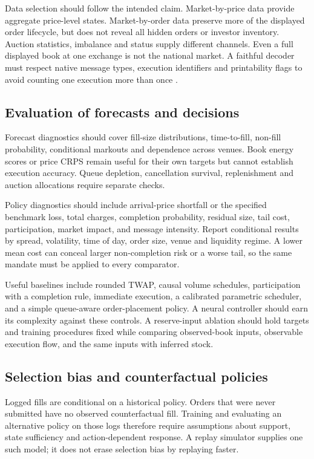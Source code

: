 \documentclass[11pt]{article}
\numberwithin{equation}{section}
\theoremstyle{definition}
\theoremstyle{remark}
\theoremstyle{definition}
\begin{document}
Data selection should follow the intended claim. Market-by-price data provide
aggregate price-level states. Market-by-order data preserve more of the
displayed order lifecycle, but does not reveal all hidden orders or investor
inventory. Auction statistics, imbalance and status supply different channels.
Even a full displayed book at one exchange is not the national market. A
faithful decoder must respect native message types, execution identifiers and
printability flags to avoid counting one execution more than once \citep{itch}.

\subsection{Evaluation of forecasts and decisions}

Forecast diagnostics should cover fill-size distributions, time-to-fill,
non-fill probability, conditional markouts and dependence across venues.
Book energy scores or price CRPS remain useful for their own targets but
cannot establish execution accuracy. Queue depletion, cancellation survival,
replenishment and auction allocations require separate checks.

Policy diagnostics should include arrival-price shortfall or the specified
benchmark loss, total charges, completion probability, residual size, tail
cost, participation, market impact, and message intensity. Report conditional
results by spread, volatility, time of day, order size, venue and liquidity
regime. A lower mean cost can conceal larger non-completion risk or a worse
tail, so the same mandate must be applied to every comparator.

Useful baselines include rounded TWAP, causal volume schedules, participation
with a completion rule, immediate execution, a calibrated parametric scheduler,
and a simple queue-aware order-placement policy. A neural controller should
earn its complexity against these controls. A reserve-input ablation should
hold targets and training procedures fixed while comparing observed-book
inputs, observable execution flow, and the same inputs with inferred stock.

\subsection{Selection bias and counterfactual policies}

Logged fills are conditional on a historical policy. Orders that were never
submitted have no observed counterfactual fill. Training and evaluating an
alternative policy on those logs therefore require assumptions about support,
state sufficiency and action-dependent response. A replay simulator supplies
one such model; it does not erase selection bias by replaying faster.
\end{document}

